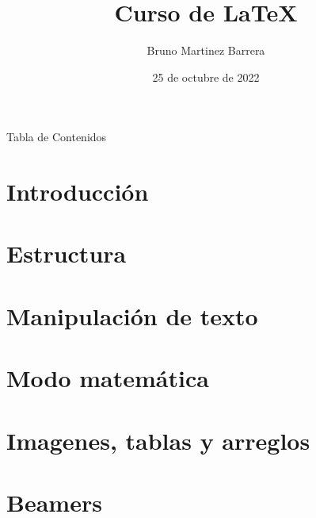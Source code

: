 \documentclass[10pt]{beamer}
\title{Curso de \LaTeX{}}
\author{Bruno Martinez Barrera}
\date{25 de octubre de 2022}
\institute{Universidad Técnica Federico Santa María}
\begin{document}
    \begin{frame}
        \maketitle
    \end{frame}
    
    \begin{frame}{Tabla de Contenidos}
        \tableofcontents[hideallsubsections]
    \end{frame}
	
\section{Introducción}

    

\section{Estructura}

    
    
\section{Manipulación de texto}

    

\section{Modo matemática}

    
    
\section{Imagenes, tablas y arreglos}

    
    
\section{Beamers}

    
\end{document}
